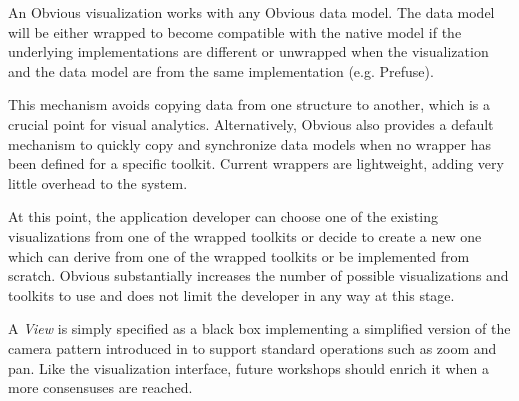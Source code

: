 
An Obvious visualization works with any Obvious data model.  The data
model will be either wrapped to become compatible with the native
model if the underlying implementations are different or unwrapped
when the visualization and the data model are from the same
implementation (e.g. Prefuse).

This mechanism avoids copying data from one structure to another,
which is a crucial point for visual analytics.  Alternatively, Obvious
also provides a default mechanism to quickly copy and synchronize data
models when no wrapper has been defined for a specific toolkit.
Current wrappers are lightweight, adding very little overhead to the
system.

At this point, the application developer can choose one of the
existing visualizations from one of the wrapped toolkits or decide to
create a new one which can derive from one of the wrapped toolkits or
be implemented from scratch.  Obvious substantially increases the
number of possible visualizations and toolkits to use and does not
limit the developer in any way at this stage.

A \emph{View} is simply specified as a black box implementing a
simplified version of the camera pattern introduced in
\cite{DesignPatternsIV} to support standard operations such as zoom
and pan.  Like the visualization interface, future workshops should
enrich it when a more consensuses are reached.

